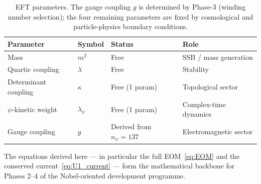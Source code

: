\documentclass[12pt]{article}
\begin{document}
\begin{table}[h]
\centering
\begin{tabular}{llll}
\hline
\textbf{Parameter} & \textbf{Symbol} & \textbf{Status} & \textbf{Role}\\
\hline
Mass & $m^2$ & Free & SSB / mass generation\\
Quartic coupling & $\lambda$ & Free & Stability\\
Determinant coupling & $\kappa$ & Free (1 param) & Topological sector\\
$\psi$-kinetic weight & $\lambda_\psi$ & Free (1 param) & Complex-time dynamics\\
Gauge coupling & $g$ & Derived from $n_\psi=137$ & Electromagnetic sector\\
\hline
\end{tabular}
\caption{EFT parameters. The gauge coupling $g$ is determined by Phase-3
  (winding number selection); the four remaining parameters are fixed by
  cosmological and particle-physics boundary conditions.}
\label{tab:parameters}
\end{table}

The equations derived here — in particular the full EOM~\eqref{eq:EOM} and the
conserved current~\eqref{eq:U1_current} — form the mathematical backbone for
Phases 2--4 of the Nobel-oriented development programme.
\end{document}
